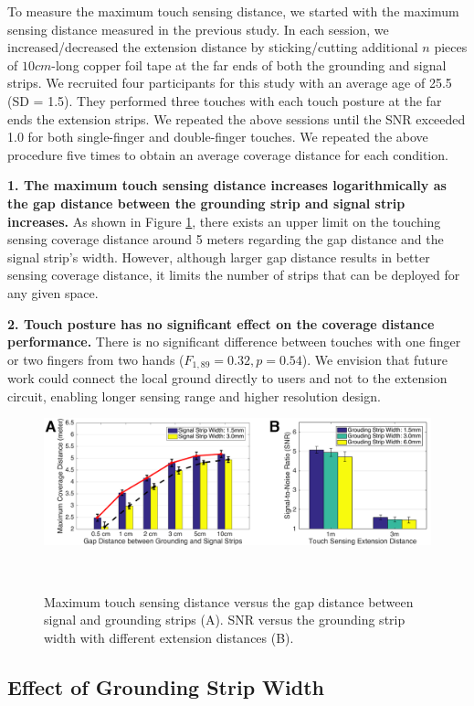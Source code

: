 To measure the maximum touch sensing distance, we started with the maximum sensing distance measured in the previous study. In each session, we increased/decreased the extension distance by sticking/cutting additional $n$ pieces of $10 cm$-long copper foil tape at the far ends of both the grounding and signal strips. We recruited four participants for this study with an average age of 25.5 (SD = 1.5). They performed three touches with each touch posture at the far ends the extension strips. We repeated the above sessions until the SNR exceeded 1.0 for both single-finger and double-finger touches. We repeated the above procedure five times to obtain an average coverage distance for each condition. 

\textbf{1. The maximum touch sensing distance increases logarithmically as the gap distance between the grounding strip and signal strip increases.} As shown in Figure \ref{fig:ground-effect}, there exists an upper limit on the touching sensing coverage distance around 5 meters regarding the gap distance and the signal strip's width. However, although larger gap distance results in better sensing coverage distance, it limits the number of strips that can be deployed for any given space.

\textbf{2. Touch posture has no significant effect on the coverage distance performance.} There is no significant difference between touches with one finger or two fingers from two hands ($F_{1,89} = 0.32, p = 0.54$). We envision that future work could connect the local ground directly to users and not to the extension circuit, enabling longer sensing range and higher resolution design.


\begin{figure}[ht]
\centering
  \includegraphics[width=0.7\columnwidth]{figures/grouding-gap-and-width.png}
  \setlength{\belowcaptionskip}{-8pt}
  \caption{Maximum touch sensing distance versus the gap distance between signal and grounding strips (A). SNR versus the grounding strip width with different extension distances (B).}~\label{fig:ground-effect}
\end{figure}

\subsection{Effect of Grounding Strip Width}

